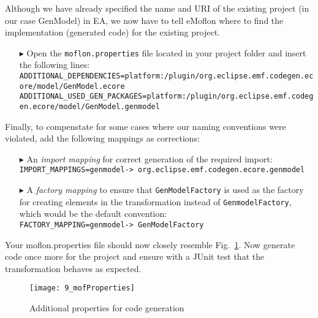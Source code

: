 Although we have already specified the name and URI of the existing project (in our case \textsf{GenModel}) in EA, we now have to tell eMoflon where to find the
implementation (generated code) for the existing project.
\begin{enumerate}
\item[$\blacktriangleright$] Open the \texttt{moflon.properties} file located in your project folder and insert the following lines:\\
\texttt{{\tiny ADDITIONAL\_DEPENDENCIES=platform:/plugin/org.eclipse.emf.codegen.ecore/model/GenModel.ecore}}\\
\texttt{{\tiny ADDITIONAL\_USED\_GEN\_PACKAGES=platform:/plugin/org.eclipse.emf.codegen.ecore/model/GenModel.genmodel}}
\end{enumerate}

Finally, to compenstate for some cases where our naming conventions were violated, add the following mappings as corrections:

\begin{enumerate}
\item[$\blacktriangleright$] An \emph{import mapping} for correct generation of the required import:\\
\texttt{\tiny IMPORT\_MAPPINGS=genmodel-> org.eclipse.emf.codegen.ecore.genmodel}

\item [$\blacktriangleright$] A \emph{factory mapping} to ensure that \texttt{GenModelFactory} is used as the factory for creating elements in the
transformation instead of \texttt{Genmodel\-Factory}, which would be the default convention:\\
\texttt{\tiny FACTORY\_MAPPING=genmodel-> GenModelFactory}
\end{enumerate}

Your \textsf{moflon.properties} file should now closely resemble Fig.~\ref{fig_mofProp}. Now generate code once more for the project and ensure with a JUnit
test that the transformation behaves as expected.

\vspace{0.5cm}

\begin{figure}[htbp]
\begin{center}  %
\hspace*{-2cm}
\texttt{[image: 9\_mofProperties]}
  \caption{Additional properties for code generation}  
  \label{fig_mofProp}
\end{center}
\end{figure} 

